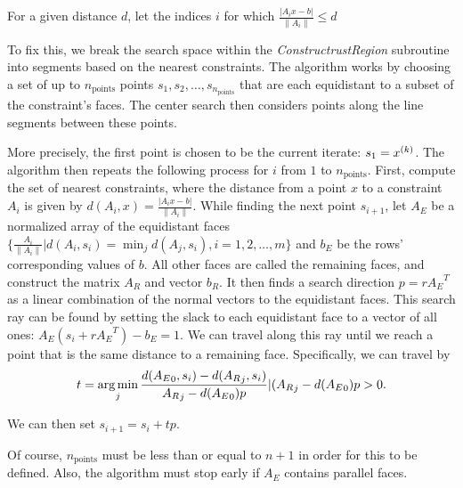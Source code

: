 For a given distance $d$, let the indices $i$ for which $\frac {|A_i x - b|}{\|A_i\|} \le d$


To fix this, we break the search space within the \emph{ConstructrustRegion} subroutine into segments based on the nearest constraints.
The algorithm works by choosing a set of up to $n_{\text{points}}$ points $s_1, s_2, \ldots, s_{n_{\text{points}}}$ that are each equidistant to a subset of the constraint's faces.
The center search then considers points along the line segments between these points.

More precisely, the first point is chosen to be the current iterate: $s_1 = x^{(k)}$.
The algorithm then repeats the following process for $i$ from $1$ to $n_{\text{points}}$.
First, compute the set of nearest constraints, where the distance from a point $x$ to a constraint $A_i$ is given by $d(A_i, x) = \frac {|A_i x - b|}{\|A_i\|}$.
While finding the next point $s_{i+1}$, let  $A_E$ be a normalized array of the equidistant faces $\{\frac{A_i}{\|A_i\|} | d(A_i, s_i) = \min_j d(A_j, s_i), i = 1, 2, \ldots, m\}$ and $b_E$ be the rows' corresponding values of $b$.
All other faces are called the remaining faces, and construct the matrix $A_R$ and vector $b_R$.
It then finds a search direction $p  = r{A_E}^T$ as a linear combination of the normal vectors to the equidistant faces.
This search ray can be found by setting the slack to each equidistant face to a vector of all ones: $A_E(s_i + r{A_E}^T) - b_E = 1$.
We can travel along this ray until we reach a point that is the same distance to a remaining face.
Specifically, we can travel by 
\begin{align}
t = \operatorname*{arg\,min}_j {\frac{d({A_E}_0, s_i) - d({A_R}_j, s_i)}{ {A_R}_j - d({A_E}_0) p} | ({A_R}_j - d({A_E}_0) p > 0 }. 
\end{align}

We can then set $s_{i+1} = s_{i} + t p$.

Of course, $n_{\text{points}}$ must be less than or equal to $n + 1$ in order for this to be defined.
Also, the algorithm must stop early if $A_E$ contains parallel faces.

